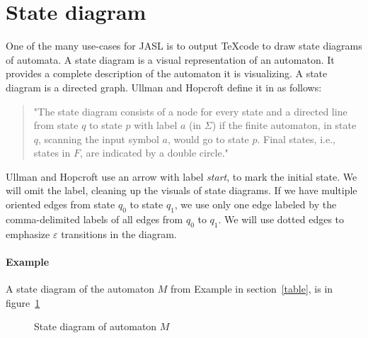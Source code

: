 \documentclass{ctuthesis}
\begin{document}
\section{State diagram}
One of the many use-cases for JASL is to output \TeX code to draw state diagrams of automata. A state diagram is a visual representation of an automaton. It provides a complete description of the automaton it is visualizing. A state diagram is a directed graph. Ullman and Hopcroft define it in 
\cite[Example 3.1, p.27]{hopcroft} as follows:
\begin{quote}
	"The state diagram consists of a node for every state and a directed line from state $q$ to state $p$ with label $a$ (in $\Sigma$) if the finite automaton, in state $q$, scanning the input symbol $a$, would go to state $p$. Final states, i.e., states in $F$, are indicated by a double circle."
\end{quote}

Ullman and Hopcroft use an arrow with label \textit{start}, to mark the initial state. We will omit the label, cleaning up the visuals of state diagrams. If we have multiple oriented edges from state $q_0$ to state $q_1$, we use only one edge labeled by the comma-delimited labels of all edges from $q_0$ to $q_1$. We will use dotted edges to emphasize $\varepsilon$ transitions in the diagram.

\paragraph{Example} A state diagram of the automaton $M$ from Example in section~\ref{table}, is in figure~\ref{fig:example-diagram}

\begin{figure}[H]
\caption{State diagram of automaton $M$}
\label{fig:example-diagram}
\end{figure}
\end{document}
